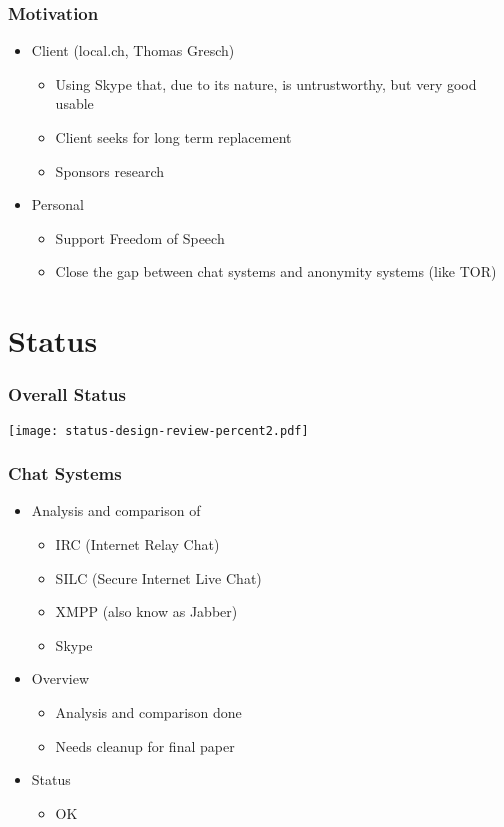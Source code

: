 \documentclass{beamer}
\begin{document}
\frame
{
  \frametitle{Motivation}
  \begin{itemize}
     \item Client (local.ch, Thomas Gresch)
     \begin{itemize}
        \item Using Skype that, due to its nature, is untrustworthy, but very good usable
        \item Client seeks for long term replacement 
        \item Sponsors research
    \end{itemize}
     \item Personal
     \begin{itemize}
        \item Support Freedom of Speech
        \item Close the gap between chat systems and anonymity systems (like TOR)
    \end{itemize}
  \end{itemize}
}

\section{Status}
\frame
{
  \frametitle{Overall Status}
  
  \begin{center}
   \texttt{[image: status-design-review-percent2.pdf]}
  \end{center}
}


\frame
{
  \frametitle{Chat Systems}
  \begin{itemize}
      \item Analysis and comparison of
      \begin{itemize}
          \item IRC (Internet Relay Chat)
          \item SILC (Secure Internet Live Chat)
          \item XMPP (also know as Jabber)
          \item Skype
      \end{itemize}
      \item Overview
      \begin{itemize}
          \item Analysis and comparison done
          \item Needs cleanup for final paper
      \end{itemize}
      \item Status
      \begin{itemize}
          \item OK
      \end{itemize}
  \end{itemize}
}
\end{document}
